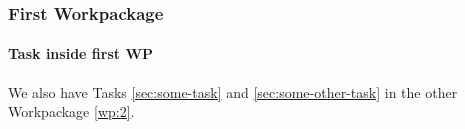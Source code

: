 \subsubsection{First Workpackage}
\label{wp:1}


\lipsum[1]

\paragraph{Task inside first WP}

We also have Tasks \ref{sec:some-task} and \ref{sec:some-other-task}
in the other Workpackage \ref{wp:2}.
 
\lipsum[1]






